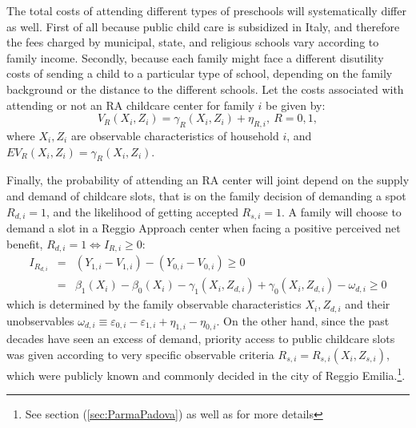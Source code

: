\documentclass[12pt]{article}
\begin{document}
The total costs of attending different types of preschools will
systematically differ as well. First of all because public child care is
subsidized in Italy, and therefore the fees charged by municipal, state, and
religious schools vary according to family income. 
Secondly, because each family might face a different disutility costs of
sending a child to a particular type of school, depending on the family
background or the distance to the different schools. Let the costs
associated with attending or not an RA childcare center for family $i$ be
given by: 
\begin{equation*}
V_{R}(X_{i},Z_{i})=\gamma_{R}(X_{i},Z_{i})+\eta_{R,i},\ R=0,1,
\end{equation*}%
where $X_{i},Z_{i}$ are observable characteristics of household $i$, and $%
EV_{R}(X_{i},Z_{i})=\gamma_{R}(X_{i},Z_{i}).$

Finally, the probability of attending an RA center will joint depend on the
supply and demand of childcare slots, that is on the family decision of
demanding a spot $R_{d,i}=1$, and the likelihood of getting accepted $%
R_{s,i}=1$. A family will choose to demand a slot in a Reggio Approach
center when facing a positive perceived net benefit, $R_{d,i}=1
\Leftrightarrow I_{R,i} \geq 0$: 
\begin{eqnarray*}
I_{R_{d,i}} &=&\left(Y_{1,i}-V_{1,i}\right)-\left(Y_{0,i}-V_{0,i}\right)
\geq 0 \\
&=&\beta_{1}(X_{i})-\beta_{0}(X_{i})-\gamma_{1}(X_{i},Z_{d,i})+%
\gamma_{0}(X_{i},Z_{d,i})-\omega_{d,i} \geq 0
\end{eqnarray*}%
which is determined by the family observable characteristics $X_{i},Z_{d,i}$
and their unobservables $\omega_{d,i} \equiv
\varepsilon_{0,i}-\varepsilon_{1,i}+\eta_{1,i}-\eta_{0,i}$. 
On the other hand, since the past decades have seen an excess of demand,
priority access to public childcare slots was given according to very
specific observable criteria $R_{s,i}=R_{s,i}(X_{i},Z_{s,i})$, which were
publicly known and commonly decided in the city of Reggio Emilia.\footnote{%
See section (\ref{sec:ParmaPadova}) as well as \cite{Brilli2016} for more
details}. 
\end{document}
